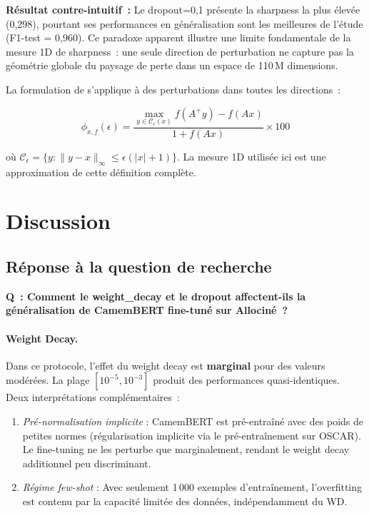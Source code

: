 \documentclass[12pt,a4paper]{article}
\begin{document}
\textbf{Résultat contre-intuitif~:} Le dropout=0,1 présente la sharpness la plus
élevée (0,298), pourtant ses performances en généralisation sont les meilleures
de l'étude (F1-test = 0,960). Ce paradoxe apparent illustre une limite fondamentale
de la mesure 1D de sharpness~: une seule direction de perturbation ne capture
pas la géométrie globale du paysage de perte dans un espace de 110\,M dimensions.

La formulation de \citet{keskar2017large} s'applique à des perturbations dans
toutes les directions~:

\begin{equation}
  \label{eq:sharpness_full}
  \phi_{x,f}(\epsilon) = \frac{\max_{y \in \mathcal{C}_\epsilon(x)} f(A^+y) - f(Ax)}{1 + f(Ax)} \times 100
\end{equation}

où $\mathcal{C}_\epsilon = \{y : \|y - x\|_\infty \leq \epsilon(|x| + 1)\}$. La
mesure 1D utilisée ici est une approximation de cette définition complète.

\section{Discussion}
\label{sec:discussion}

\subsection{Réponse à la question de recherche}
\label{ssec:reponse_qr}

\textbf{Q~: Comment le weight\_decay et le dropout affectent-ils la généralisation
de CamemBERT fine-tuné sur Allociné~?}

\paragraph{Weight Decay.}
Dans ce protocole, l'effet du weight decay est \textbf{marginal} pour des valeurs
modérées. La plage $[10^{-5}, 10^{-3}]$ produit des performances quasi-identiques.
Deux interprétations complémentaires~:

\begin{enumerate}
  \item \textit{Pré-normalisation implicite} : CamemBERT est pré-entraîné avec
    des poids de petites normes (régularisation implicite via le pré-entraînement sur OSCAR).
    Le fine-tuning ne les perturbe que marginalement, rendant le weight decay additionnel
    peu discriminant.
  \item \textit{Régime few-shot} : Avec seulement 1\,000 exemples d'entraînement,
    l'overfitting est contenu par la capacité limitée des données, indépendamment du WD.
\end{enumerate}
\end{document}
